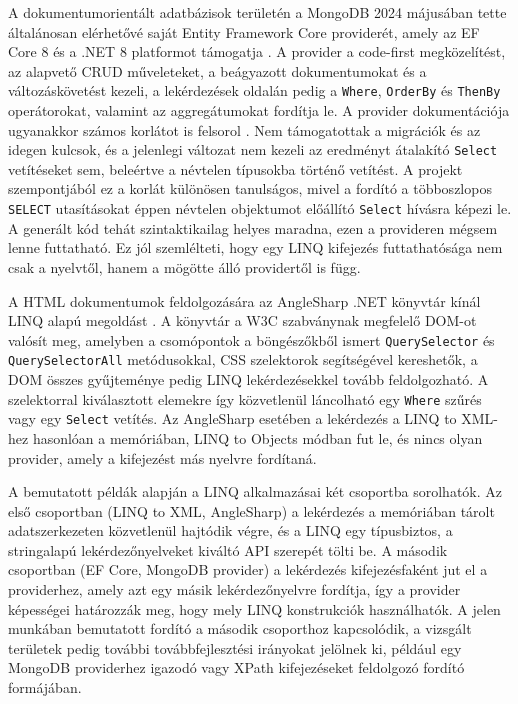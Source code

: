 \documentclass[a4paper,12pt]{article}
\begin{document}
A dokumentumorientált adatbázisok területén a MongoDB 2024 májusában tette általánosan elérhetővé saját Entity Framework Core providerét, amely az EF Core 8 és a .NET 8 platformot támogatja \cite{mongodb2024efcore}. A provider a code-first megközelítést, az alapvető CRUD műveleteket, a beágyazott dokumentumokat és a változáskövetést kezeli, a lekérdezések oldalán pedig a \texttt{Where}, \texttt{OrderBy} és \texttt{ThenBy} operátorokat, valamint az aggregátumokat fordítja le. A provider dokumentációja ugyanakkor számos korlátot is felsorol \cite{mongodb2024limitations}. Nem támogatottak a migrációk és az idegen kulcsok, és a jelenlegi változat nem kezeli az eredményt átalakító \texttt{Select} vetítéseket sem, beleértve a névtelen típusokba történő vetítést. A projekt szempontjából ez a korlát különösen tanulságos, mivel a fordító a többoszlopos \texttt{SELECT} utasításokat éppen névtelen objektumot előállító \texttt{Select} hívásra képezi le. A generált kód tehát szintaktikailag helyes maradna, ezen a provideren mégsem lenne futtatható. Ez jól szemlélteti, hogy egy LINQ kifejezés futtathatósága nem csak a nyelvtől, hanem a mögötte álló providertől is függ.

A HTML dokumentumok feldolgozására az AngleSharp .NET könyvtár kínál LINQ alapú megoldást \cite{anglesharp}. A könyvtár a W3C szabványnak megfelelő DOM-ot valósít meg, amelyben a csomópontok a böngészőkből ismert \texttt{QuerySelector} és \texttt{QuerySelectorAll} metódusokkal, CSS szelektorok segítségével kereshetők, a DOM összes gyűjteménye pedig LINQ lekérdezésekkel tovább feldolgozható. A szelektorral kiválasztott elemekre így közvetlenül láncolható egy \texttt{Where} szűrés vagy egy \texttt{Select} vetítés. Az AngleSharp esetében a lekérdezés a LINQ to XML-hez hasonlóan a memóriában, LINQ to Objects módban fut le, és nincs olyan provider, amely a kifejezést más nyelvre fordítaná.

A bemutatott példák alapján a LINQ alkalmazásai két csoportba sorolhatók. Az első csoportban (LINQ to XML, AngleSharp) a lekérdezés a memóriában tárolt adatszerkezeten közvetlenül hajtódik végre, és a LINQ egy típusbiztos, a stringalapú lekérdezőnyelveket kiváltó API szerepét tölti be. A második csoportban (EF Core, MongoDB provider) a lekérdezés kifejezésfaként jut el a providerhez, amely azt egy másik lekérdezőnyelvre fordítja, így a provider képességei határozzák meg, hogy mely LINQ konstrukciók használhatók. A jelen munkában bemutatott fordító a második csoporthoz kapcsolódik, a vizsgált területek pedig további továbbfejlesztési irányokat jelölnek ki, például egy MongoDB providerhez igazodó vagy XPath kifejezéseket feldolgozó fordító formájában.
\end{document}
